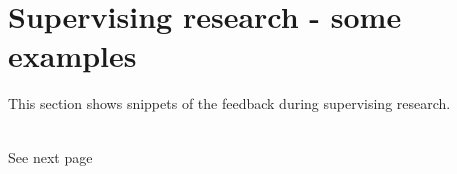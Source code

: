 \chapter{Supervising research - some examples}\label{appendices:research_supervising}
This section shows snippets of the feedback during supervising research.\\\\
\begin{minipage}{0.5\textwidth}
\begin{flushleft}
\end{flushleft}
\end{minipage}
\hfill
\begin{minipage}{0.5\textwidth}
\begin{flushright}
   See next page
\end{flushright}
\end{minipage}



